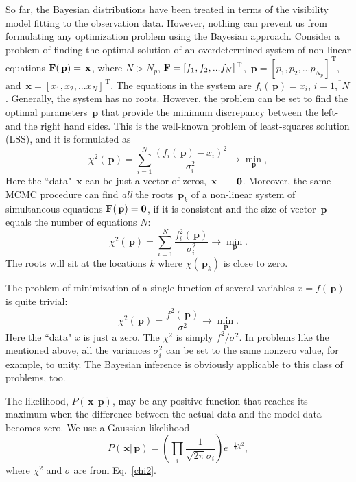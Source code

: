 \documentclass[preprint2]{aastex}
\newcommand{\bfp}{\,\mathbf{p}}
\newcommand{\bfx}{\,\mathbf{x}}
\newcommand{\uT}{\,\mathrm{T}}
\begin{document}
So far, the Bayesian distributions have been treated in terms of the visibility model fitting to the observation data. However, nothing can prevent us from formulating any optimization problem using the Bayesian approach. Consider a problem of finding the optimal solution of an overdetermined system of non-linear equations ${\bf F}(\bfp) = \bfx$, where $N > N_p$, ${\bf F} = [f_1, f_2, ... f_N]^{\uT}$, $\bfp = [p_1, p_2, ... p_{N_p}]^{\uT}$, and $\bfx = [x_1, x_2, ... x_N]^{\uT}$. The equations in the system are $f_i(\bfp) = x_i$, $i = \overline{1,\;N}$. Generally, the system has no roots. However, the problem can be set to find the optimal parameters $\bfp$ that provide the minimum discrepancy between the left- and the right hand sides. This is the well-known problem of least-squares solution (LSS), and it is formulated as   
\begin{equation}
  \label{nonlin_sys_opt}
  \chi^2(\bfp) = \sum_{i=1}^{N} \frac{(f_i(\bfp) - x_i)^2}{\sigma_i^2}  \rightarrow {\min\limits_{\bfp}},
\end{equation}
Here the ``data" $\bfx$ can be just a vector of zeros, $\bfx~\equiv~{\bf 0}$. Moreover, the same MCMC procedure can find \emph{all} the roots $\bfp_k$ of a non-linear system of simultaneous equations ${\bf F}(\bfp) = {\bf 0}$, if it is consistent and the size of vector $\bfp$ equals the number of equations $N$:
\begin{equation}
  \label{vec_fun_opt}
  \chi^2(\bfp) = \sum_{i=1}^{N} \frac{f_i^2(\bfp)}{\sigma_i^2}  \rightarrow {\min\limits_{\bfp}}.
\end{equation}
The roots will sit at the locations $k$ where $\chi(\bfp_k)$ is close to zero.

The problem of minimization of a single function of several variables $x = f(\bfp)$ is quite trivial:
\begin{equation}
  \label{single_fun_opt}
  \chi^2(\bfp) =  \frac{f^2(\bfp)}{\sigma^2} \rightarrow {\min\limits_{\bfp}}.
\end{equation}
Here the ``data" $x$ is just a zero. The $\chi^2$ is simply $f^2/\sigma^2$. In problems like the mentioned above, all the variances $\sigma_i^2$ can be set to the same nonzero value, for example, to unity. The Bayesian inference is obviously applicable to this class of problems, too.


The likelihood, $P(\bfx|\bfp)$, may be any positive function that reaches its maximum when the difference between the actual data and the model data becomes zero. We use a Gaussian likelihood
\begin{equation}
  \label{gaussian_likelihood}
  P(\bfx|\bfp) = \left(\prod_i \frac{1}{\sqrt{2 \pi} \sigma_i} \right) e^{-\frac{1}{2}\chi^2},
\end{equation}
where $\chi^2$ and $\sigma$ are from Eq.~\eqref{chi2}.
\end{document}
